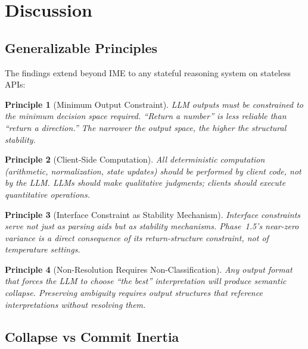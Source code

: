 \documentclass[11pt,a4paper]{article}
\newtheorem{principle}{Principle}
\begin{document}
\section{Discussion}
\label{sec:discussion}

\subsection{Generalizable Principles}

The findings extend beyond IME to any stateful reasoning system on stateless APIs:

\begin{principle}[Minimum Output Constraint]
LLM outputs must be constrained to the minimum decision space required. ``Return
a number'' is less reliable than ``return a direction.'' The narrower the output
space, the higher the structural stability.
\end{principle}

\begin{principle}[Client-Side Computation]
All deterministic computation (arithmetic, normalization, state updates) should
be performed by client code, not by the LLM. LLMs should make qualitative
judgments; clients should execute quantitative operations.
\end{principle}

\begin{principle}[Interface Constraint as Stability Mechanism]
Interface constraints serve not just as parsing aids but as stability
mechanisms. Phase~1.5's near-zero variance is a direct consequence of its
return-structure constraint, not of temperature settings.
\end{principle}

\begin{principle}[Non-Resolution Requires Non-Classification]
Any output format that forces the LLM to choose ``the best'' interpretation
will produce semantic collapse. Preserving ambiguity requires output structures
that reference interpretations without resolving them.
\end{principle}

\subsection{Collapse vs Commit Inertia}
\end{document}

